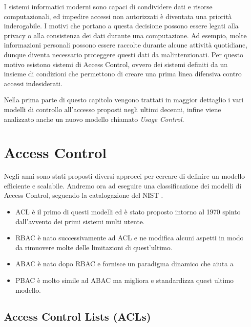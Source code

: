 
\label{cap:accessControl}
I sistemi informatici moderni sono capaci di condividere dati e
risorse computazionali, ed impedire accessi non autorizzati è diventata
una priorità inderogabile.
I motivi che portano a questa decisione possono essere legati alla privacy o alla consistenza dei dati durante una computazione.
Ad esempio, molte informazioni personali possono essere
raccolte durante alcune attività quotidiane, dunque diventa necessario
proteggere questi dati da malintenzionati. Per questo motivo esistono sistemi di Access Control, ovvero dei sistemi
definiti da un insieme di condizioni che permettono di creare una prima
linea difensiva contro accessi indesiderati.


Nella prima parte di questo capitolo vengono trattati in maggior dettaglio i vari modelli 
di controllo all'accesso proposti negli ultimi decenni, infine viene analizzato anche un nuovo modello chiamato \textit{Usage Control}.

\section{Access Control}
\label{sec:history}



Negli anni sono stati proposti diversi approcci per cercare di definire un
modello efficiente e scalabile. Andremo ora ad eseguire una classificazione
dei modelli di Access Control, seguendo la catalogazione del NIST \cite{NISTACM}.

\begin{itemize}
\item \acl{ACL} è il primo di questi modelli ed è stato proposto intorno al 1970 spinto
dall’avvento dei primi sistemi multi utente.
\item \acl{RBAC} è nato successivamente ad \ac{ACL} e ne modifica alcuni aspetti in modo da rimuovere
molte delle limitazioni di quest’ultimo. 
\item \acl{ABAC} è nato dopo \ac{RBAC} e fornisce un paradigma dinamico che aiuta a 
\item \acl{PBAC} è molto simile ad \ac{ABAC} ma migliora e standardizza quest ultimo modello.

\end{itemize}

\subsection*{Access Control Lists (ACLs)}
\label{sub:ACL}

